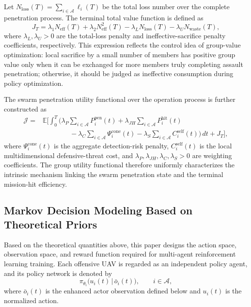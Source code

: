 \documentclass{cja}
\begin{document}
Let $N_{\mathrm{loss}}(T)=\sum_{i\in\mathcal{A}}\ell_i(T)$ be the total loss number over the complete penetration process. The terminal total value function is defined as
\begin{equation}
J_T
=
\lambda_1 N_{\mathrm{eff}}(T)
+
\lambda_2 N_{\mathrm{eff}}^2(T)
-
\lambda_L N_{\mathrm{loss}}(T)
-
\lambda_U N_{\mathrm{waste}}(T),
\end{equation}
where $\lambda_L,\lambda_U>0$ are the total-loss penalty and ineffective-sacrifice penalty coefficients, respectively. This expression reflects the control idea of group-value optimization: local sacrifice by a small number of members has positive group value only when it can be exchanged for more members truly completing assault penetration; otherwise, it should be judged as ineffective consumption during policy optimization.

The swarm penetration utility functional over the operation process is further constructed as
\begin{equation}
\begin{aligned}
\mathcal J
={}&
\mathbb E\Biggl[
\int_0^T
\Biggl(
\lambda_P \sum_{i\in\mathcal{A}} P_i^{\mathrm{pen}}(t)
+
\lambda_{JH} \sum_{i\in\mathcal{A}} P_i^{\mathrm{hit}}(t)\\
&\qquad\qquad
-
\lambda_C \sum_{i\in\mathcal{A}} \Psi_i^{\mathrm{cone}}(t)
-
\lambda_S \sum_{i\in\mathcal{A}} C_i^{\mathrm{self}}(t)
\Biggr)\,dt
+
J_T
\Biggr],
\end{aligned}
\end{equation}
where $\Psi_i^{\mathrm{cone}}(t)$ is the aggregate detection-risk penalty, $C_i^{\mathrm{self}}(t)$ is the local multidimensional defensive-threat cost, and $\lambda_P,\lambda_{JH},\lambda_C,\lambda_S>0$ are weighting coefficients. The group utility functional therefore uniformly characterizes the intrinsic mechanism linking the swarm penetration state and the terminal mission-hit efficiency.

\subsection{Markov Decision Modeling Based on Theoretical Priors}
\label{subsec:rl-design}

Based on the theoretical quantities above, this paper designs the action space, observation space, and reward function required for multi-agent reinforcement learning training. Each offensive UAV is regarded as an independent policy agent, and its policy network is denoted by
\begin{equation}
\pi_{\theta_i}\bigl(u_i(t)\,\big|\,\bar o_i(t)\bigr),\qquad i\in\mathcal{A},
\end{equation}
where $\bar o_i(t)$ is the enhanced actor observation defined below and $u_i(t)$ is the normalized action.
\end{document}
